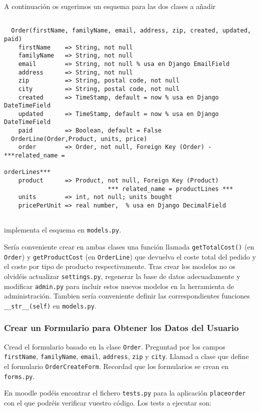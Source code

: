 \documentclass[12pt]{article} %
\newcommand{\ttt}[1]{\texttt{#1}}%
\newcommand{\modelss}{\texttt{models.py}}%
\newcommand{\settings}{\texttt{settings.py}}%
\newcommand{\forms}{\texttt{forms.py}}%
\newcommand{\tests}{\texttt{tests.py}}%
\newcommand{\admin}{\texttt{admin.py}}%
\begin{document}
A continuación os sugerimos un esquema para las dos clases a añadir

\begin{verbatim}
  
  Order(firstName, familyName, email, address, zip, created, updated, paid)
    firstName    => String, not null
    familyName   => String, not null
    email        => String, not null % usa en Django EmailField
    address      => String, not null 
    zip          => String, postal code, not null
    city         => String, postal code, not null
    created      => TimeStamp, default = now % usa en Django DateTimeField
    updated      => TimeStamp, default = now % usa en Django DateTimeField
    paid         => Boolean, default = False
  OrderLine(Order,Product, units, price)
    order        => Order, not null, Foreign Key (Order) - ***related_name = 
                                                              orderLines***
    product      => Product, not null, Foreign Key (Product)
                             *** related_name = productLines ***
    units        => int, not null; units bought
    pricePerUnit => real number,  % usa en Django DecimalField 
      
\end{verbatim}
implementa el esquema en \modelss{}.

Sería conveniente crear en ambas clases  una función llamada \ttt{getTotalCost()} (en \ttt{Order}) y \ttt{getProductCost} (en \ttt{OrderLine}) que devuelva el coste total del pedido y el coste por tipo de producto
respectivamente. Tras crear los modelos no os olvidéis actualizar \settings{},  regenerar la base de datos adecuadamente y modificar \admin{} para incluir estos nuevos modelos en la herramienta de administración. Tambien sería conveniente definir las correspondientes funciones \ttt{\_\_str\_\_(self)} en \modelss.

\subsubsection{Crear un Formulario para Obtener los Datos del Usuario}

Cread el formulario basado en la clase \ttt{Order}. Preguntad por los campos \ttt{firstName}, \ttt{familyName}, \ttt{email}, \ttt{address}, \ttt{zip} y \ttt{city}. Llamad a clase que define el formulario \ttt{OrderCreateForm}. Recordad que los formularios se crean en \forms.

En moodle podéis encontrar el fichero \tests{} para la aplicación \ttt{placeorder} con el que podréis verificar vuestro código. Los tests a ejecutar son:
\end{document}
